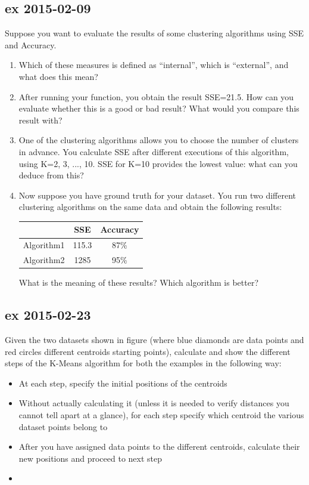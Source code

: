 \documentclass[a4paper,12pt,titlepage]{article} %
\begin{document}
\subsection{ex 2015-02-09}
Suppose you want to evaluate the results of some clustering algorithms using SSE and Accuracy.
\begin{enumerate}
\item Which of these measures is defined as “internal”, which is “external”, and what does this mean? 
\item After running your function, you obtain the result SSE=21.5. How can you evaluate whether this is a good or bad result? What would you compare this result with?
\item One of the clustering algorithms allows you to choose the number of clusters in advance. You calculate SSE after different executions of this algorithm, using K=2, 3, ..., 10. SSE for K=10 provides the lowest value: what can you deduce from this?
\item Now suppose you have ground truth for your dataset. You run two different clustering algorithms on the same data and obtain the following results:

\begin{center}
	\begin{tabular}{c|cc}
                & SSE & Accuracy\\
                \hline
                Algorithm1 & 115.3 & 87\% \\
                Algorithm2 & 1285 & 95\% \\
	\end{tabular}
\end{center}

What is the meaning of these results? Which algorithm is better?
\end{enumerate}

\subsection{ex 2015-02-23}
Given the two datasets shown in figure (where blue diamonds are data points and red circles different centroids starting points), calculate and show the different steps of the K-Means algorithm for both the examples in the following way:
\begin{itemize}
\item At each step, specify the initial positions of the centroids
\item Without actually calculating it (unless it is needed to verify distances you cannot tell apart at a glance), for each step specify which centroid the various dataset points belong to
\item After you have assigned data points to the different centroids, calculate their new positions and proceed to next step
\item 
\end{itemize}
\end{document}
